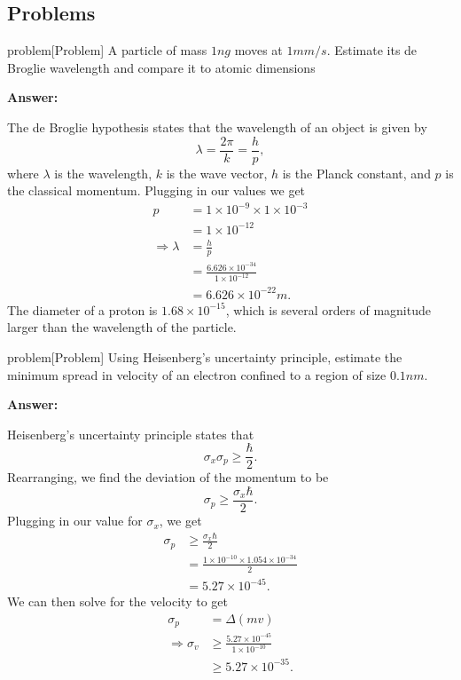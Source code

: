 \documentclass{article}
\begin{document}
\subsection{Problems}
\begin{callout}{problem}[Problem]
\label{problem:s1-p1}
A particle of mass $1 ng$ moves at $1 mm/s$. Estimate its de Broglie wavelength and compare it to atomic dimensions

\noindent\textbf{Answer:}

The de Broglie hypothesis states that the wavelength of an object is given by
\[
    \lambda =\frac{2\pi }{k}=\frac{h}{p},
\]
where $\lambda $ is the wavelength, $k$ is the wave vector, $h$ is the Planck constant, and $p$ is the classical momentum. Plugging in our values we get
\begin{align*}
    p &= 1\times 10^{-9} \times 1\times 10^{-3}\\
        &=1\times 10^{-12} \\
    \Rightarrow \lambda &= \frac{h}{p} \\
                        &= \frac{6.626\times 10^{-34}}{1\times 10^{-12}}\\
                        &= 6.626\times 10^{-22}m.
\end{align*}
The diameter of a proton is $1.68\times 10^{-15}$, which is several orders of magnitude larger than the wavelength of the particle.
\end{callout}

\begin{callout}{problem}[Problem]
\label{problem:s1-p2}
Using Heisenberg's uncertainty principle, estimate the minimum spread in velocity of an electron confined to a region of size $0.1 nm$.

\noindent \textbf{Answer:}

Heisenberg's uncertainty principle states that
\[
    \sigma _x\sigma _p\geq \frac{\hbar}{2}.
\]
Rearranging, we find the deviation of the momentum to be
\[
    \sigma _p\geq \frac{\sigma _x \hbar}{2}.
\]
Plugging in our value for $\sigma _x$, we get
\begin{align*}
    \sigma _p &\geq \frac{\sigma _x \hbar}{2}  \\
              &= \frac{1\times 10^{-10}\times 1.054\times 10^{-34}}{2} \\
              &=5.27\times 10^{-45}.
\end{align*}
We can then solve for the velocity to get
\begin{align*}
    \sigma _p &= \Delta (mv) \\
    \Rightarrow \sigma _v &\geq \frac{5.27\times 10^{-45}}{1\times 10^{-10}} \\
                          &\geq 5.27\times 10^{-35}.
\end{align*}
\end{callout}
\end{document}

